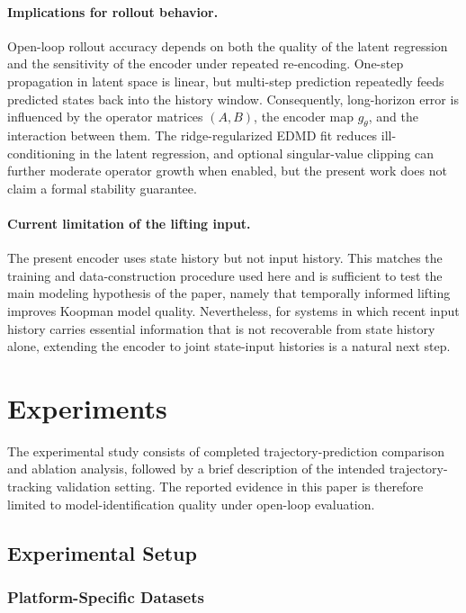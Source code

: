 \documentclass[journal]{IEEEtran}
\begin{document}
\paragraph{Implications for rollout behavior.}
Open-loop rollout accuracy depends on both the quality of the latent regression and the sensitivity of the encoder under repeated re-encoding. One-step propagation in latent space is linear, but multi-step prediction repeatedly feeds predicted states back into the history window. Consequently, long-horizon error is influenced by the operator matrices $(A,B)$, the encoder map $g_\theta$, and the interaction between them. The ridge-regularized EDMD fit reduces ill-conditioning in the latent regression, and optional singular-value clipping can further moderate operator growth when enabled, but the present work does not claim a formal stability guarantee.

\paragraph{Current limitation of the lifting input.}
The present encoder uses state history but not input history. This matches the training and data-construction procedure used here and is sufficient to test the main modeling hypothesis of the paper, namely that temporally informed lifting improves Koopman model quality. Nevertheless, for systems in which recent input history carries essential information that is not recoverable from state history alone, extending the encoder to joint state-input histories is a natural next step.

\section{Experiments}
\label{sec:experiments}

The experimental study consists of completed trajectory-prediction comparison and ablation analysis, followed by a brief description of the intended trajectory-tracking validation setting. The reported evidence in this paper is therefore limited to model-identification quality under open-loop evaluation.

\subsection{Experimental Setup}

\subsubsection{Platform-Specific Datasets}
\end{document}

